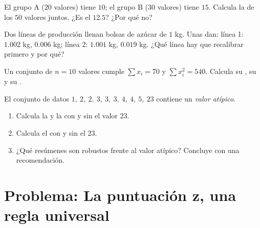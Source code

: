 \begin{exercise}[$\star\star$]\label{exo:g11:stat:7}
El grupo A ($20$ valores) tiene  $10$; el grupo B ($30$ valores)
tiene  $15$. Calcula la  de los $50$ valores juntos. ¿Es el
 $12.5$? ¿Por qué no?
\end{exercise}

\begin{exercise}[$\star\star$]\label{exo:g11:stat:8}
Dos líneas de producción llenan bolsas de azúcar de $1$ kg. Unas 
dan: línea 1:  $1.002$ kg,  $0.006$ kg; línea 2:
 $1.001$ kg,  $0.019$ kg. ¿Qué línea hay que
recalibrar primero y por qué?
\end{exercise}

\begin{exercise}[$\star\star$]\label{exo:g11:stat:9}
Un conjunto de $n = 10$ valores cumple $\sum x_i = 70$ y
$\sum x_i^2 = 540$. Calcula su , su  y su .
\end{exercise}

\begin{exercise}[$\star\star\star$]\label{exo:g11:stat:10}
El conjunto de datos $1,\ 2,\ 2,\ 3,\ 3,\ 3,\ 4,\ 4,\ 5,\ 23$ contiene un
\emph{valor atípico}.
\begin{enumerate}
  \item Calcula la  y la  con y sin el valor $23$.
  \item Calcula el  con y sin el $23$.
  \item ¿Qué resúmenes son robustos frente al valor atípico? Concluye con
        una recomendación.
\end{enumerate}
\end{exercise}

\section{Problema: La puntuación z, una regla universal}


